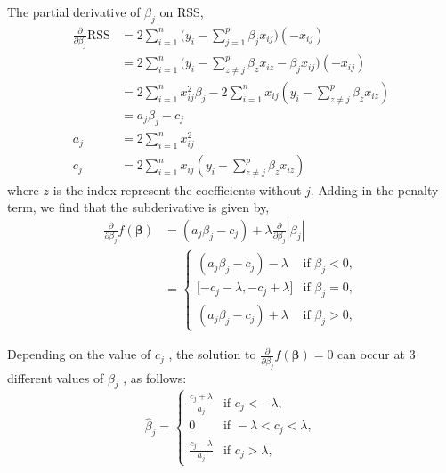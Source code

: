 \documentclass[12pt,a4paper]{article}%
\theoremstyle{definition}
\theoremstyle{plain}
\numberwithin{equation}{section}
\begin{document}
The partial derivative of $\beta_{j}$ on RSS, 
\begin{align*}
\frac{\partial}{\partial\beta_{j}} \text{RSS} &=  2 \sum\limits_{i=1}^{n} \bigg(y_{i}- \sum\limits_{j=1}^{p} \beta_{j} x_{ij}\bigg) (-x_{ij}) \\
 											  &=  2 \sum\limits_{i=1}^{n} \bigg(y_{i} - \sum\limits_{z \neq j}^{p} \beta_{z} x_{iz} -  \beta_{j}x_{ij} \bigg) (-x_{ij}) \\
 											  &=  2 \sum\limits_{i=1}^{n} x_{ij}^{2} \beta_{j} - 2\sum\limits_{i=1}^{n} x_{ij}(y_{i} - \sum\limits_{z \neq j}^{p} \beta_{z} x_{iz}) \\
 											  &=  a_{j}\beta_{j} - c_{j} \\
        							  a_{j}   &=  2 \sum\limits_{i=1}^{n} x_{ij}^{2}  \\
                                      c_{j}   &=  2\sum\limits_{i=1}^{n} x_{ij}(y_{i} - \sum\limits_{z \neq j}^{p} \beta_{z} x_{iz})
\end{align*}
where $z$ is the index represent the coefficients without $j$. Adding in the penalty term, we find that the subderivative is given by,
\begin{align*}
\frac{\partial}{\partial \beta_{j}} f(\boldsymbol{\beta}) &= (a_{j}\beta_{j} - c_{j}) + \lambda \frac{\partial}{\partial \beta_{j}} |\beta_{j}| \\
													      &= \left\{
\begin{array}{ll}
(a_{j}\beta_{j} - c_{j})-\lambda & \mbox{if } \beta_{j} < 0,\\
{[} -c_{j}-\lambda , -c_{j}+\lambda {]} & \mbox{if } \beta_{j} = 0, \\
(a_{j}\beta_{j} - c_{j})+\lambda & \mbox{if } \beta_{j} > 0, 
\end{array} \right.
\end{align*}

Depending on the value of $c_{j}$ , the solution to $\frac{\partial}{\partial \beta_{j}} f(\boldsymbol{\beta}) =0$ can occur at 3 different values of $\beta_{j}$ , as follows:
\begin{equation*}
\hat{\beta}_{j} = \left\{
\begin{array}{ll}
\frac{c_{j}+\lambda}{a_{j}}   & \mbox{if } c_{j} < -\lambda, \\
 0 & \mbox{if } -\lambda < c_{j} < \lambda , \\
\frac{c_{j}-\lambda}{a_{j}}  & \mbox{if }  c_{j} > \lambda,
\end{array} \right.
\end{equation*}
\end{document}
